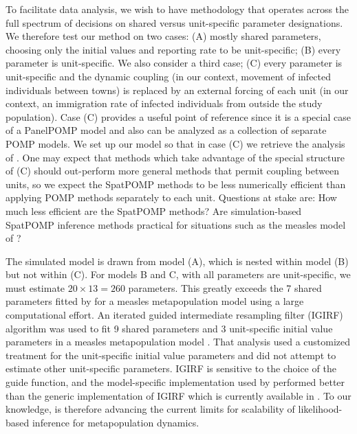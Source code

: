 \documentclass[12pt]{article}\usepackage[]{graphicx}\usepackage[]{xcolor}
\begin{document}
To facilitate data analysis, we wish to have methodology that operates across the full spectrum of decisions on shared versus unit-specific parameter designations.
We therefore test our method on two cases: (A) mostly shared parameters, choosing only the initial values and reporting rate to be unit-specific; (B) every parameter is unit-specific.
We also consider a third case; (C) every parameter is unit-specific and the dynamic coupling (in our context, movement of infected individuals between towns) is replaced by an external forcing of each unit (in our context, an immigration rate of infected individuals from outside the study population).
Case (C) provides a useful point of reference since it is a special case of a PanelPOMP model \citep{breto19} and also can be analyzed as a collection of separate POMP models.
We set up our model so that in case (C) we retrieve the analysis of \citet{he10}.
One may expect that methods which take advantage of the special structure of (C) should out-perform more general methods that permit coupling between units, so we expect the SpatPOMP methods to be less numerically efficient than applying POMP methods separately to each unit.
Questions at stake are: How much less efficient are the SpatPOMP methods? Are simulation-based SpatPOMP inference methods practical for situations such as the measles model of \citet{he10}?


The simulated model is drawn from model (A), which is nested within model (B) but not within (C).
For models B and C, with all parameters are unit-specific, we must estimate $20\times 13=260$ parameters.
This greatly exceeds the 7 shared parameters fitted by \citet{ionides21} for a measles metapopulation model using a large computational effort.
An iterated guided intermediate resampling filter (IGIRF) algorithm was used to fit 9 shared parameters and 3 unit-specific initial value parameters in a measles metapopulation model \citep{park20}.
That analysis used a customized treatment for the unit-specific initial value parameters and did not attempt to estimate other unit-specific parameters.
IGIRF is sensitive to the choice of the guide function, and the model-specific implementation used by \citet{park20} performed better than the generic implementation of IGIRF which is currently available in .
To our knowledge, {\ibpf} is therefore advancing the current limits for scalability of likelihood-based inference for metapopulation dynamics.
\end{document}
